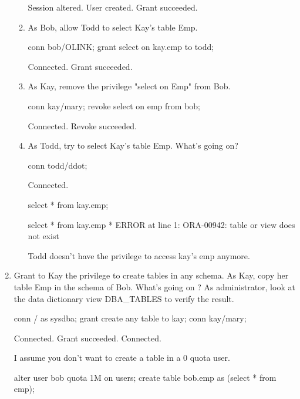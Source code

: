 \documentclass{article}
\begin{document}
\begin{enumerate}
\begin{enumerate}
\begin{messageshell}
Session altered.
User created.
Grant succeeded.
\end{messageshell}

 \item{As Bob, allow Todd to select Kay’s table Emp.}
\begin{sqlshell}
conn bob/OLINK;
grant select on kay.emp to todd;
\end{sqlshell}
\begin{messageshell}
Connected.
Grant succeeded.
\end{messageshell}

 \item{As Kay, remove the privilege "select on Emp" from Bob.}
\begin{sqlshell}
conn kay/mary;
revoke select on emp from bob;
\end{sqlshell}
\begin{messageshell}
Connected.
Revoke succeeded.
\end{messageshell}

 \item{As Todd, try to select Kay’s table Emp. What's going on?}
\begin{sqlshell}
conn todd/ddot;
\end{sqlshell}
\begin{messageshell}
Connected.
\end{messageshell}
\begin{sqlshell}
select * from kay.emp;
\end{sqlshell}
\begin{messageshell}
select * from kay.emp
                  *
ERROR at line 1:
ORA-00942: table or view does not exist

\end{messageshell}
Todd doesn't have the privilege to access kay's emp anymore.

 \end{enumerate}

\item{Grant to Kay the privilege to create tables in any schema. As Kay, copy her table Emp in the schema of Bob. What's going on ? As administrator, look at the data dictionary view DBA\_TABLES to verify the result.}
\begin{sqlshell}
conn / as sysdba;
grant create any table to kay;
conn kay/mary;
\end{sqlshell}
\begin{messageshell}
Connected.
Grant succeeded.
Connected.
\end{messageshell}
I assume you don't want to create a table in a 0 quota user. 
\begin{sqlshell}
alter user bob quota 1M on users;
create table bob.emp as (select * from emp);
\end{sqlshell}


\end{enumerate}
\end{document}
